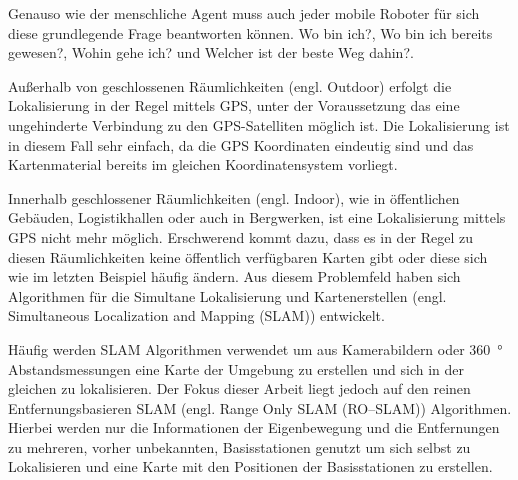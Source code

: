 \documentclass[12pt]{article}
\begin{document}
Genauso wie der menschliche Agent muss auch jeder mobile Roboter für sich diese grundlegende Frage beantworten können. \glqq Wo bin ich?\grqq{}, \glqq Wo bin ich bereits gewesen?\grqq, \glqq Wohin gehe ich?\grqq{} und \glqq Welcher ist der beste Weg dahin?\grqq{}\cite{murphy2000introduction}.

Außerhalb von geschlossenen Räumlichkeiten (engl. Outdoor) erfolgt die Lokalisierung in der Regel mittels GPS, unter der Voraussetzung das eine ungehinderte Verbindung zu den GPS-Satelliten möglich ist. Die Lokalisierung ist in diesem Fall sehr einfach, da die GPS Koordinaten eindeutig sind und das Kartenmaterial bereits im gleichen Koordinatensystem vorliegt.

Innerhalb geschlossener Räumlichkeiten (engl. Indoor), wie in öffentlichen Gebäuden, Logistikhallen oder auch in Bergwerken, ist eine Lokalisierung mittels GPS nicht mehr möglich. Erschwerend kommt dazu, dass es in der Regel zu diesen Räumlichkeiten keine öffentlich verfügbaren Karten gibt oder diese sich wie im letzten Beispiel häufig ändern. Aus diesem Problemfeld haben sich Algorithmen für die Simultane Lokalisierung und Kartenerstellen (engl. Simultaneous Localization and Mapping (SLAM)) entwickelt.

Häufig werden SLAM Algorithmen verwendet um aus Kamerabildern oder \SI{360}{\degree} Abstandsmessungen eine Karte der Umgebung zu erstellen und sich in der gleichen zu lokalisieren. Der Fokus dieser Arbeit liegt jedoch auf den reinen Entfernungsbasieren SLAM (engl. Range Only SLAM (RO--SLAM)) Algorithmen. Hierbei werden nur die Informationen der Eigenbewegung und die Entfernungen zu mehreren, vorher unbekannten, Basisstationen genutzt um sich selbst zu Lokalisieren und eine Karte mit den Positionen der Basisstationen zu erstellen.
\end{document}
